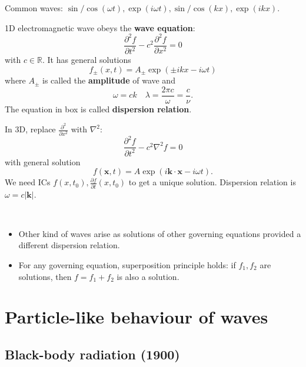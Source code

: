 \documentclass[a4paper,11pt]{article}
\begin{document}
\begin{example}
    Common waves: $ \sin/\cos(\omega t) , \exp(i\omega t), \sin/\cos(kx), \exp(ikx) $. 
\end{example}

\begin{example}
    1D electromagnetic wave obeys the \textbf{wave equation}: 
    \begin{equation}\label{eqn:I.1.wave_eqn}
        \frac{\partial^2 f}{\partial t^2} - c^2 \frac{\partial^2 f}{\partial x^2} = 0
    \end{equation}
    with $c\in \mathbb{R}$. It has general solutions 
    \[
        f_{\pm}(x,t) = A_{\pm}\exp(\pm ikx-i\omega t)
    \]
    where $A_{\pm}$ is called the \textbf{amplitude} of wave and
    \[
        \boxed{\omega=ck}\quad \lambda = \frac{2\pi c}{\omega} = \frac{c}{\nu}. 
    \]
    The equation in box is called \textbf{dispersion relation}. 

    In 3D, replace $\frac{\partial^2 }{\partial x^2} $ with $ \nabla^2 $:
    \begin{equation}\label{eqn:I.1.wave_eqn_3d}
        \frac{\partial^2 f}{\partial t^2} - c^2 \nabla^2 f = 0
    \end{equation}
    with general solution 
    \[
        f(\mathbf{x},t) = A \exp(i \mathbf{k}\cdot \mathbf{x} - i \omega t).
    \]
    We need ICs $ f(x,t_0),\frac{\partial f}{\partial t}(x,t_0)  $ to get a unique solution. Dispersion relation is $ \omega = c|\mathbf{k}| $. 
\end{example}

\begin{note}\
    \begin{itemize}
        \item Other kind of waves arise as solutions of other governing equations provided a different dispersion relation. 
        \item For any governing equation, superposition principle holds: if $ f_1,f_2 $ are solutions, then $f=f_1+f_2$ is also a solution. 
    \end{itemize}
\end{note}

\section{Particle-like behaviour of waves}
\subsection{Black-body radiation (1900)}
\end{document}
